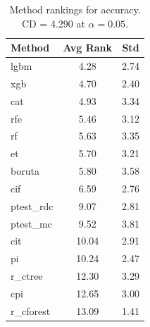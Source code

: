\begin{table}[h]
\centering
\caption{Method rankings for accuracy. CD = 4.290 at $\alpha=0.05$.}
\label{tab:ranks_accuracy}
\begin{tabular}{lcc}
\toprule
Method & Avg Rank & Std \\
\midrule
lgbm & 4.28 & 2.74 \\
xgb & 4.70 & 2.40 \\
cat & 4.93 & 3.34 \\
rfe & 5.46 & 3.12 \\
rf & 5.63 & 3.35 \\
et & 5.70 & 3.21 \\
boruta & 5.80 & 3.58 \\
cif & 6.59 & 2.76 \\
ptest_rdc & 9.07 & 2.81 \\
ptest_mc & 9.52 & 3.81 \\
cit & 10.04 & 2.91 \\
pi & 10.24 & 2.47 \\
r_ctree & 12.30 & 3.29 \\
cpi & 12.65 & 3.00 \\
r_cforest & 13.09 & 1.41 \\
\bottomrule
\end{tabular}
\end{table}